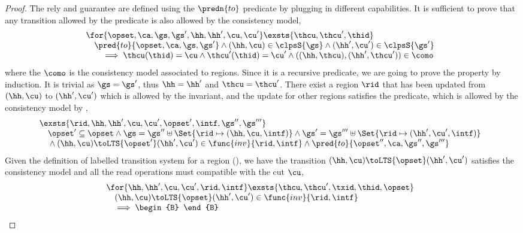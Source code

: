 \begin{proof}
The rely and guarantee are defined using the \( \predn{to}\) predicate by plugging in different capabilities.
It is sufficient to prove that any transition allowed by the  predicate is also allowed by the consistency model,
\[
\begin{array}{@{}l}
    \for{\opset, \ca, \gs, \gs', \hh, \hh', \cu, \cu'}
    \exsts{\thcu, \thcu', \thid} \\
    \quad \pred{to}{\opset, \ca, \gs, \gs'} 
    \land (\hh, \cu) \in \clpsS{\gs}
    \land (\hh', \cu') \in \clpsS{\gs'} \\
    \qquad \implies 
    \thcu(\thid) = \cu
    \land \thcu'(\thid) = \cu'
    \land ((\hh, \thcu),(\hh', \thcu')) \in \como
\end{array}
\]
where the \( \como \) is the consistency model associated to regions.
Since it is a recursive predicate, we are going to prove the property by induction.
\caseB{\(\opset = \unitO\)}
It is trivial as \(\gs = \gs'\), thus \( \hh = \hh' \) and \( \thcu = \thcu' \).
\caseI{\(\opset \neq \unitO\)}
There exist a region \( \rid \) that has been updated from \( (\hh, \cu) \) to \( (\hh', \cu') \) which is allowed by the invariant, and the update for other regions satisfies the predicate, which is allowed by the consistency model by \ih,
\[
    \begin{array}[t]{@{}l}
    \exsts{\rid, \hh, \hh', \cu, \cu', \opset', \intf, \gs'',\gs''' }  \\
    \quad \opset' \subseteq \opset
    \land \gs = \gs'' \uplus \Set{\rid \mapsto (\hh, \cu, \intf)} 
    \land \gs' = \gs''' \uplus \Set{\rid \mapsto (\hh', \cu', \intf)}  \\
    \quad {} \land (\hh,\cu) \toLTS{\opset'} (\hh',\cu') \in \func{inv}{\rid, \intf }
    \land \pred{to}{\opset'', \ca, \gs'',\gs'''}
    \end{array}
\]
Given the definition of labelled transition system for a region (), we have the transition \( (\hh, \cu) \toLTS{\opset} (\hh', \cu') \) satisfies the consistency model and all the read operations must compatible with the cut \( \cu \),
\[
\begin{array}{@{}l}
    \for{\hh, \hh', \cu, \cu', \rid, \intf}
    \exsts{ \thcu, \thcu', \txid, \thid, \opset } \\
    \quad (\hh, \cu) \toLTS{\opset} (\hh', \cu') \in \func{inv}{\rid, \intf} \\
    \quad \implies
    \begin{B}

\end{B}
\end{array}\]
\end{proof}
